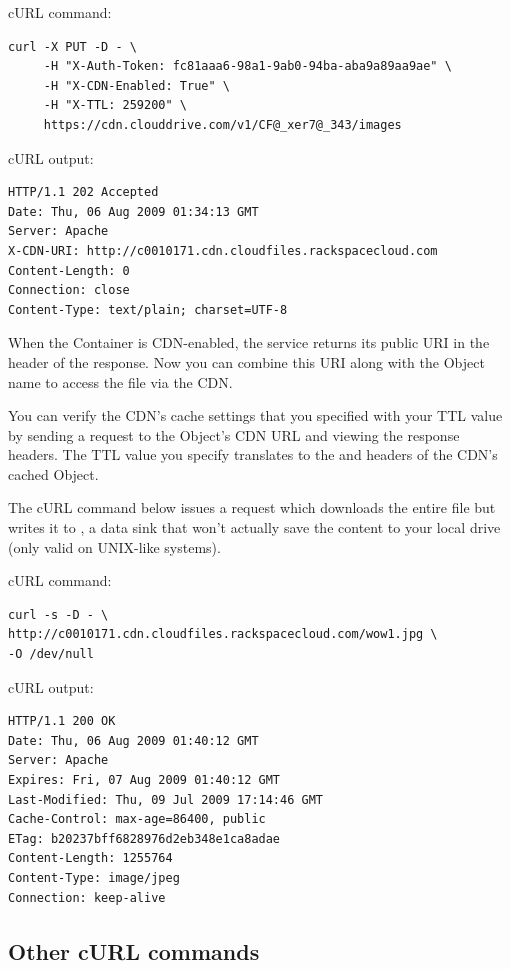 \documentclass[letterpaper,10pt,english]{manual}
\begin{document}
cURL command:

\begin{Verbatim}[commandchars=@\[\]]
curl -X PUT -D - \
     -H "X-Auth-Token: fc81aaa6-98a1-9ab0-94ba-aba9a89aa9ae" \
     -H "X-CDN-Enabled: True" \
     -H "X-TTL: 259200" \
     https://cdn.clouddrive.com/v1/CF@_xer7@_343/images
\end{Verbatim}

cURL output:

\begin{Verbatim}[commandchars=@\[\]]
HTTP/1.1 202 Accepted
Date: Thu, 06 Aug 2009 01:34:13 GMT
Server: Apache
X-CDN-URI: http://c0010171.cdn.cloudfiles.rackspacecloud.com
Content-Length: 0
Connection: close
Content-Type: text/plain; charset=UTF-8
\end{Verbatim}

When the Container is CDN-enabled, the service returns its public URI
in the \code{X-CDN-URI} header of the response.  Now you can combine this
URI along with the Object name to access the file via the CDN.

You can verify the CDN's cache settings that you specified with your TTL
value by sending a  request to the Object's CDN URL and viewing the
response headers.  The TTL value you specify translates to the 
and  headers of the CDN's cached Object.

The cURL command below issues a \code{GET} request which downloads the
entire file but writes it to \code{/dev/null}, a data sink that won't
actually save the content to your local drive (only valid on UNIX-like
systems).

cURL command:

\begin{Verbatim}[commandchars=@\[\]]
curl -s -D - \
http://c0010171.cdn.cloudfiles.rackspacecloud.com/wow1.jpg \
-O /dev/null
\end{Verbatim}

cURL output:

\begin{Verbatim}[commandchars=@\[\]]
HTTP/1.1 200 OK
Date: Thu, 06 Aug 2009 01:40:12 GMT
Server: Apache
Expires: Fri, 07 Aug 2009 01:40:12 GMT
Last-Modified: Thu, 09 Jul 2009 17:14:46 GMT
Cache-Control: max-age=86400, public
ETag: b20237bff6828976d2eb348e1ca8adae
Content-Length: 1255764
Content-Type: image/jpeg
Connection: keep-alive
\end{Verbatim}


\subsection{Other cURL commands}
\end{document}

